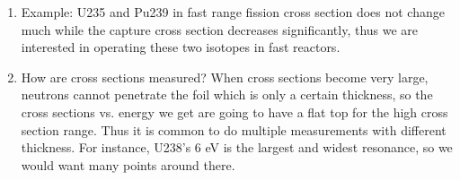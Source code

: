 \documentclass{school-22.211-notes}
\begin{document}
\begin{enumerate}
\item Example: U235 and Pu239 in fast range fission cross section does not change much while the capture cross section decreases significantly, thus we are interested in operating these two isotopes in fast reactors. 

\item How are cross sections measured? When cross sections become very large, neutrons cannot penetrate the foil which is only a certain thickness, so the cross sections vs. energy we get are going to have a flat top for the high cross section range. Thus it is common to do multiple measurements with different thickness. For instance, U238's 6 eV is the largest and widest resonance, so we would want many points around there. 
\end{enumerate}
\end{document}
